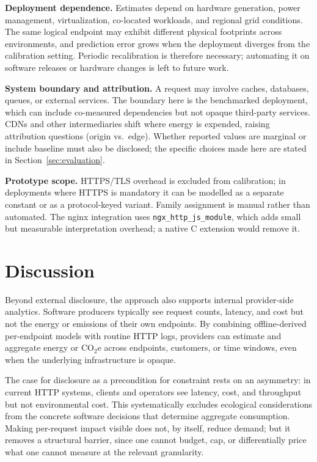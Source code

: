 \documentclass[sigconf]{acmart}
\begin{document}
\textbf{Deployment dependence.}
Estimates depend on hardware generation, power management, virtualization, co-located workloads, and regional grid conditions. The same logical endpoint may exhibit different physical footprints across environments, and prediction error grows when the deployment diverges from the calibration setting. Periodic recalibration is therefore necessary; automating it on software releases or hardware changes is left to future work.

\textbf{System boundary and attribution.}
A request may involve caches, databases, queues, or external services. The boundary here is the benchmarked deployment, which can include co-measured dependencies but not opaque third-party services. CDNs and other intermediaries shift where energy is expended, raising attribution questions (origin vs.\ edge). Whether reported values are marginal or include baseline must also be disclosed; the specific choices made here are stated in Section~\ref{sec:evaluation}.

\textbf{Prototype scope.}
HTTPS/TLS overhead is excluded from calibration; in deployments where HTTPS is mandatory it can be modelled as a separate constant or as a protocol-keyed variant. Family assignment is manual rather than automated. The nginx integration uses \texttt{ngx\_http\_js\_module}, which adds small but measurable interpretation overhead; a native C extension would remove it.


\section{Discussion}

Beyond external disclosure, the approach also supports internal provider-side analytics. Software producers typically see request counts, latency, and cost but not the energy or emissions of their own endpoints. By combining offline-derived per-endpoint models with routine HTTP logs, providers can estimate and aggregate energy or \(\mathrm{CO_2e}\) across endpoints, customers, or time windows, even when the underlying infrastructure is opaque.

The case for disclosure as a precondition for constraint rests on an asymmetry: in current HTTP systems, clients and operators see latency, cost, and throughput but not environmental cost. This systematically excludes ecological considerations from the concrete software decisions that determine aggregate consumption. Making per-request impact visible does not, by itself, reduce demand; but it removes a structural barrier, since one cannot budget, cap, or differentially price what one cannot measure at the relevant granularity.
\end{document}

